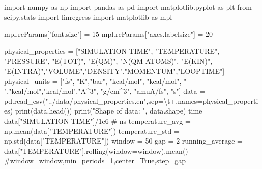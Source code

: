 \documentclass[
  letterpaper,
  DIV=11,
  numbers=noendperiod]{scrreprt}
\newenvironment{Shaded}{\begin{snugshade}}{\end{snugshade}}
\newcommand{\BuiltInTok}[1]{\textcolor[rgb]{0.00,0.23,0.31}{#1}}
\newcommand{\CharTok}[1]{\textcolor[rgb]{0.13,0.47,0.30}{#1}}
\newcommand{\CommentTok}[1]{\textcolor[rgb]{0.37,0.37,0.37}{#1}}
\newcommand{\DecValTok}[1]{\textcolor[rgb]{0.68,0.00,0.00}{#1}}
\newcommand{\FloatTok}[1]{\textcolor[rgb]{0.68,0.00,0.00}{#1}}
\newcommand{\ImportTok}[1]{\textcolor[rgb]{0.00,0.46,0.62}{#1}}
\newcommand{\NormalTok}[1]{\textcolor[rgb]{0.00,0.23,0.31}{#1}}
\newcommand{\OperatorTok}[1]{\textcolor[rgb]{0.37,0.37,0.37}{#1}}
\newcommand{\StringTok}[1]{\textcolor[rgb]{0.13,0.47,0.30}{#1}}
\begin{document}
\begin{Shaded}
\begin{Highlighting}[]
\ImportTok{import}\NormalTok{ numpy }\ImportTok{as}\NormalTok{ np}
\ImportTok{import}\NormalTok{ pandas }\ImportTok{as}\NormalTok{ pd}
\ImportTok{import}\NormalTok{ matplotlib.pyplot }\ImportTok{as}\NormalTok{ plt}
\ImportTok{from}\NormalTok{ scipy.stats }\ImportTok{import}\NormalTok{ linregress}
\ImportTok{import}\NormalTok{ matplotlib }\ImportTok{as}\NormalTok{ mpl}

\NormalTok{mpl.rcParams[}\StringTok{"font.size"}\NormalTok{] }\OperatorTok{=} \DecValTok{15}
\NormalTok{mpl.rcParams[}\StringTok{"axes.labelsize"}\NormalTok{] }\OperatorTok{=} \DecValTok{20}


\NormalTok{physical\_properties }\OperatorTok{=}\NormalTok{ [}\StringTok{"SIMULATION{-}TIME"}\NormalTok{, }\StringTok{"TEMPERATURE"}\NormalTok{, }\StringTok{"PRESSURE"}\NormalTok{, }\StringTok{"E(TOT)"}\NormalTok{, }\StringTok{"E(QM)"}\NormalTok{, }\StringTok{"N(QM{-}ATOMS)"}\NormalTok{, }\StringTok{"E(KIN)"}\NormalTok{, }\StringTok{"E(INTRA)"}\NormalTok{,}\StringTok{"VOLUME"}\NormalTok{,}\StringTok{"DENSITY"}\NormalTok{,}\StringTok{"MOMENTUM"}\NormalTok{,}\StringTok{"LOOPTIME"}\NormalTok{]}
\NormalTok{physical\_units }\OperatorTok{=}\NormalTok{ [}\StringTok{"fs"}\NormalTok{, }\StringTok{"K"}\NormalTok{,}\StringTok{"bar"}\NormalTok{, }\StringTok{"kcal/mol"}\NormalTok{, }\StringTok{"kcal/mol"}\NormalTok{, }\StringTok{"{-}"}\NormalTok{,}\StringTok{"kcal/mol"}\NormalTok{,}\StringTok{"kcal/mol"}\NormalTok{,}\StringTok{"A\^{}3"}\NormalTok{, }\StringTok{"g/cm\^{}3"}\NormalTok{, }\StringTok{"amuA/fs"}\NormalTok{, }\StringTok{"s"}\NormalTok{]}
\NormalTok{data }\OperatorTok{=}\NormalTok{ pd.read\_csv(}\StringTok{"../data/physical\_properties.en"}\NormalTok{,sep}\OperatorTok{=}\StringTok{\textquotesingle{}}\CharTok{\textbackslash{}t}\StringTok{+\textquotesingle{}}\NormalTok{,names}\OperatorTok{=}\NormalTok{physical\_properties)}
\BuiltInTok{print}\NormalTok{(data.head())}
\BuiltInTok{print}\NormalTok{(}\StringTok{"Shape of data: "}\NormalTok{, data.shape)}
\NormalTok{time }\OperatorTok{=}\NormalTok{ data[}\StringTok{"SIMULATION{-}TIME"}\NormalTok{]}\OperatorTok{/}\FloatTok{1e6} \CommentTok{\# ns}
\NormalTok{temperature\_avg }\OperatorTok{=}\NormalTok{ np.mean(data[}\StringTok{"TEMPERATURE"}\NormalTok{])}
\NormalTok{temperature\_std }\OperatorTok{=}\NormalTok{ np.std(data[}\StringTok{"TEMPERATURE"}\NormalTok{])}
\NormalTok{window }\OperatorTok{=} \DecValTok{50}
\NormalTok{gap }\OperatorTok{=} \DecValTok{2}
\NormalTok{running\_average }\OperatorTok{=}\NormalTok{ data[}\StringTok{"TEMPERATURE"}\NormalTok{].rolling(window}\OperatorTok{=}\NormalTok{window).mean() }\CommentTok{\#window=window,min\_periods=1,center=True,step=gap}


\end{Highlighting}
\end{Shaded}
\end{document}
